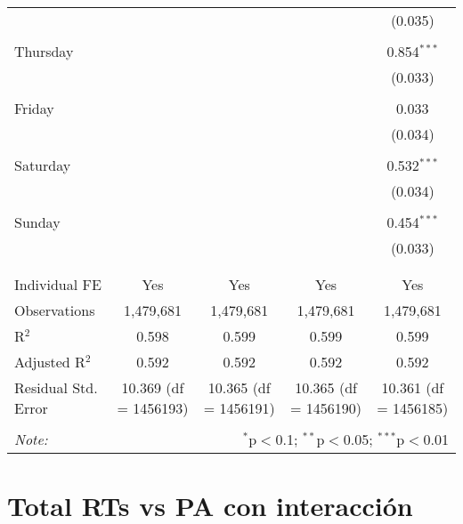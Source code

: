 \documentclass[
]{article}
\begin{document}
\begin{table}[!htbp]
{\begin{tabular}{@{\extracolsep{5pt}}lcccc}
  &  &  &  & (0.035) \\ 
  & & & & \\ 
 Thursday &  &  &  & 0.854$^{***}$ \\ 
  &  &  &  & (0.033) \\ 
  & & & & \\ 
 Friday &  &  &  & 0.033 \\ 
  &  &  &  & (0.034) \\ 
  & & & & \\ 
 Saturday &  &  &  & 0.532$^{***}$ \\ 
  &  &  &  & (0.034) \\ 
  & & & & \\ 
 Sunday &  &  &  & 0.454$^{***}$ \\ 
  &  &  &  & (0.033) \\ 
  & & & & \\ 
\hline \\[-1.8ex] 
Individual FE & Yes & Yes & Yes & Yes \\ 
Observations & 1,479,681 & 1,479,681 & 1,479,681 & 1,479,681 \\ 
R$^{2}$ & 0.598 & 0.599 & 0.599 & 0.599 \\ 
Adjusted R$^{2}$ & 0.592 & 0.592 & 0.592 & 0.592 \\ 
Residual Std. Error & 10.369 (df = 1456193) & 10.365 (df = 1456191) & 10.365 (df = 1456190) & 10.361 (df = 1456185) \\ 
\hline 
\hline \\[-1.8ex] 
\textit{Note:}  & \multicolumn{4}{r}{$^{*}$p$<$0.1; $^{**}$p$<$0.05; $^{***}$p$<$0.01} \\ 
\end{tabular}
} 
\end{table} 
\newpage
\section{Total RTs vs PA con interacción}
\end{document}
